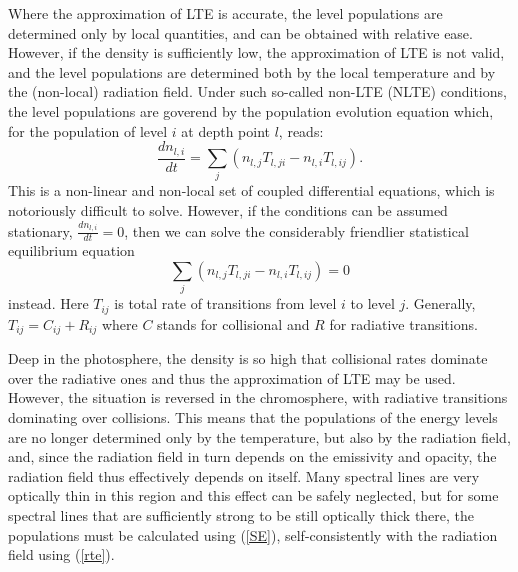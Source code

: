 \documentclass{aa}
\begin{document}
Where the approximation of LTE is accurate, the level populations are determined only by local quantities, and can be obtained with relative ease. However, if the density is sufficiently low, the approximation of LTE is not valid, and the level populations are determined both by the local temperature and by the (non-local) radiation field. Under such so-called non-LTE (NLTE) conditions, the level populations are goverend by the population evolution equation which, for the population of level $i$ at depth point $l$, reads:
\begin{equation}
 \frac{d n_{l,i}}{d t} = \sum_j (n_{l,j} T_{l,ji} - n_{l,i} T_{l,ij}).
\end{equation}
This is a non-linear and non-local set of coupled differential equations, which is notoriously difficult to solve. However, if the conditions can be assumed stationary, $\frac{d n_{l,i}}{d t} = 0$, then we can solve the considerably friendlier statistical equilibrium equation
\begin{equation}
 \sum_j (n_{l,j} T_{l,ji} - n_{l,i} T_{l,ij}) = 0
 \label{SE}
\end{equation}
instead. Here $T_{ij}$ is total rate of transitions from level $i$ to level $j$. Generally, $T_{ij} = C_{ij} + R_{ij}$ where $C$ stands for collisional and $R$ for radiative transitions.

Deep in the photosphere, the density is so high that collisional rates dominate over the radiative ones and thus the approximation of LTE may be used. However, the situation is reversed in the chromosphere, with radiative transitions dominating over collisions. This means that the populations of the energy levels are no longer determined only by the temperature, but also by the radiation field, and, since the radiation field in turn depends on the emissivity and opacity, the radiation field thus effectively depends on itself. Many spectral lines are very optically thin in this region and this effect can be safely neglected, but for some spectral lines that are sufficiently strong to be still optically thick there, the populations must be calculated using (\ref{SE}), self-consistently with the radiation field using (\ref{rte}). 
\end{document}
